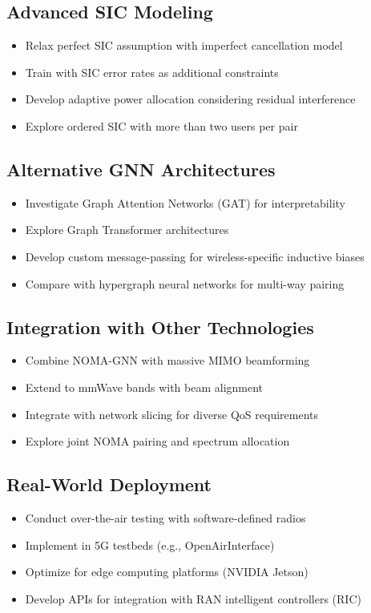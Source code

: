\subsection{Advanced SIC Modeling}
\begin{itemize}
    \item Relax perfect SIC assumption with imperfect cancellation model
    \item Train with SIC error rates as additional constraints
    \item Develop adaptive power allocation considering residual interference
    \item Explore ordered SIC with more than two users per pair
\end{itemize}

\subsection{Alternative GNN Architectures}
\begin{itemize}
    \item Investigate Graph Attention Networks (GAT) for interpretability
    \item Explore Graph Transformer architectures
    \item Develop custom message-passing for wireless-specific inductive biases
    \item Compare with hypergraph neural networks for multi-way pairing
\end{itemize}

\subsection{Integration with Other Technologies}
\begin{itemize}
    \item Combine NOMA-GNN with massive MIMO beamforming
    \item Extend to mmWave bands with beam alignment
    \item Integrate with network slicing for diverse QoS requirements
    \item Explore joint NOMA pairing and spectrum allocation
\end{itemize}

\subsection{Real-World Deployment}
\begin{itemize}
    \item Conduct over-the-air testing with software-defined radios
    \item Implement in 5G testbeds (e.g., OpenAirInterface)
    \item Optimize for edge computing platforms (NVIDIA Jetson)
    \item Develop APIs for integration with RAN intelligent controllers (RIC)
\end{itemize}

